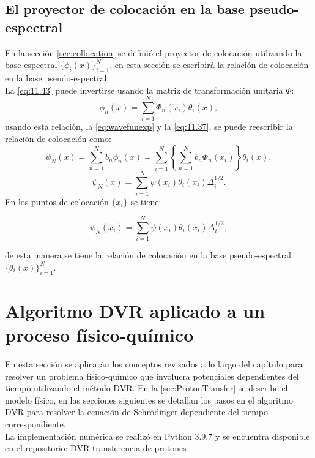 \subsection{El proyector de colocación en la base pseudo-espectral}
En la sección \autoref{sec:collocation} se definió el proyector de colocación utilizando la base espectral $\{ \phi_i(x)\}_{i=1}^{N}$, en esta sección se escribirá la relación de colocación en la base pseudo-espectral.
\\

La \autoref{eq:11.43} puede invertirse usando la matriz de transformación unitaria $\Phi$:
\begin{equation}
  \label{eq:11.51}
  \phi_n(x) = \sum_{i=1}^{N}\Phi_n(x_i)\theta_i(x),
\end{equation}
usando esta relación, la \autoref{eq:wavefunexp} y la \autoref{eq:11.37}, se puede reescribir la relación de colocación como:
\begin{equation}
  \label{eq:11.53}
  \psi_N(x) = \sum_{n=1}^N b_n\phi_n(x) = \sum_{i=1}^N \left \{ \sum_{n=1}^Nb_n\Phi_n(x_i)\right\} \theta_i(x),
\end{equation}
\begin{equation}
  \label{eq:11.54}
  \psi_N(x) = \sum_{i=1}^N \psi(x_i)\theta_i(x_i)\Delta_i^{1/2}.
\end{equation}
En los puntos de colocación $\{x_i\}$ se tiene:

\begin{equation}
  \label{eq:11.55}
  \psi_N(x_i) = \sum_{i=1}^N \psi(x_i)\theta_i(x_i)\Delta_i^{1/2},
\end{equation}

\noindent de esta manera se tiene la relación de colocación en la base pseudo-espectral $\{ \theta_i(x)\}_{i=1}^N$.

\section{Algoritmo DVR aplicado a un proceso físico-químico}\label{sec:DVRapp}

En esta sección se aplicarán los conceptos revisados a lo largo del capítulo para resolver un problema físico-químico que involucra potenciales dependientes del tiempo utilizando el método \acs{DVR}. En la \autoref{sec:ProtonTransfer} se describe el modelo físico, en las secciones siguientes se detallan los pasos en el algoritmo \acs{DVR} para resolver la ecuación de Schrödinger dependiente del tiempo correspondiente.
\\
La implementación numérica se realizó en Python 3.9.7 y se encuentra disponible en el repositorio: \href{https://github.com/Jessi-MM/LSTM_PropagatorLearning/blob/main/src/Update_Proton_Transfer_DataGenerate.ipynb}{\faGithub DVR transferencia de protones}

